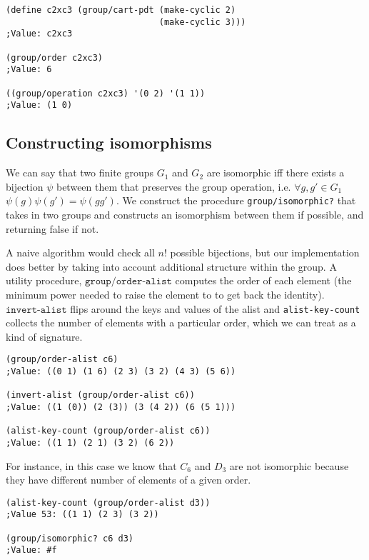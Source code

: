 \documentclass{article}
\begin{document}
\begin{verbatim}
(define c2xc3 (group/cart-pdt (make-cyclic 2)
			                  (make-cyclic 3)))
;Value: c2xc3

(group/order c2xc3)
;Value: 6

((group/operation c2xc3) '(0 2) '(1 1))
;Value: (1 0)
\end{verbatim}
    
    	\subsection{Constructing isomorphisms}
            
            We can say that two finite groups $G_1$ and $G_2$ are isomorphic iff there exists a bijection $\psi$ between them that preserves the group operation, i.e. $\forall g, g' \in G_1$ $\psi(g)\psi(g') = \psi(gg')$. We construct the procedure \texttt{group/isomorphic?} that takes in two groups and constructs an isomorphism between them if possible, and returning false if not.
            
            A naive algorithm would check all $n!$ possible bijections, but our implementation does better by taking into account additional structure within the group. A utility procedure, $\texttt{group/order-alist}$ computes the order of each element (the minimum power needed to raise the element to to get back the identity). $\texttt{invert-alist}$ flips around the keys and values of the alist and \texttt{alist-key-count} collects the number of elements with a particular order, which we can treat as a kind of signature.
		
\begin{verbatim}
(group/order-alist c6)
;Value: ((0 1) (1 6) (2 3) (3 2) (4 3) (5 6))

(invert-alist (group/order-alist c6))
;Value: ((1 (0)) (2 (3)) (3 (4 2)) (6 (5 1)))

(alist-key-count (group/order-alist c6))
;Value: ((1 1) (2 1) (3 2) (6 2))
\end{verbatim}
		
            For instance, in this case we know that $C_{6}$ and $D_3$ are not isomorphic because they have different number of elements of a given order.

\begin{verbatim}
(alist-key-count (group/order-alist d3))
;Value 53: ((1 1) (2 3) (3 2))

(group/isomorphic? c6 d3)
;Value: #f
\end{verbatim}
\end{document}
